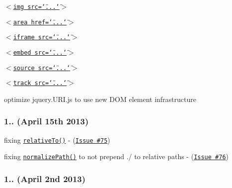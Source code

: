 \begin{DoxyItemize}
\begin{DoxyItemize}
\item \href{http://www.w3.org/html/wg/drafts/html/master/embedded-content-0.html#the-img-element}{\tt {\ttfamily $<$img src=\char`\"{}...\char`\"{}$>$}}
\item \href{http://www.w3.org/html/wg/drafts/html/master/embedded-content-0.html#the-area-element}{\tt {\ttfamily $<$area href=\char`\"{}...\char`\"{}$>$}}
\item \href{http://www.w3.org/html/wg/drafts/html/master/embedded-content-0.html#the-iframe-element}{\tt {\ttfamily $<$iframe src=\char`\"{}...\char`\"{}$>$}}
\item \href{http://www.w3.org/html/wg/drafts/html/master/embedded-content-0.html#the-embed-element}{\tt {\ttfamily $<$embed src=\char`\"{}...\char`\"{}$>$}}
\item \href{http://www.w3.org/html/wg/drafts/html/master/embedded-content-0.html#the-source-element}{\tt {\ttfamily $<$source src=\char`\"{}...\char`\"{}$>$}}
\item \href{http://www.w3.org/html/wg/drafts/html/master/embedded-content-0.html#the-track-element}{\tt {\ttfamily $<$track src=\char`\"{}...\char`\"{}$>$}}
\end{DoxyItemize}
\item optimize {\ttfamily jquery.\+U\+R\+I.\+js} to use new D\+OM element infrastructure
\end{DoxyItemize}

\subsubsection*{1.. (April 15th 2013)}


\begin{DoxyItemize}
\item fixing \href{http://medialize.github.io/URI.js/docs.html#relativeto}{\tt {\ttfamily relative\+To()}} -\/ (\href{https://github.com/medialize/URI.js/issues/75}{\tt Issue \#75})
\item fixing \href{http://medialize.github.io/URI.js/docs.html#normalize-path}{\tt {\ttfamily normalize\+Path()}} to not prepend {\ttfamily ./} to relative paths -\/ (\href{https://github.com/medialize/URI.js/issues/76}{\tt Issue \#76})
\end{DoxyItemize}

\subsubsection*{1.. (April 2nd 2013)}


